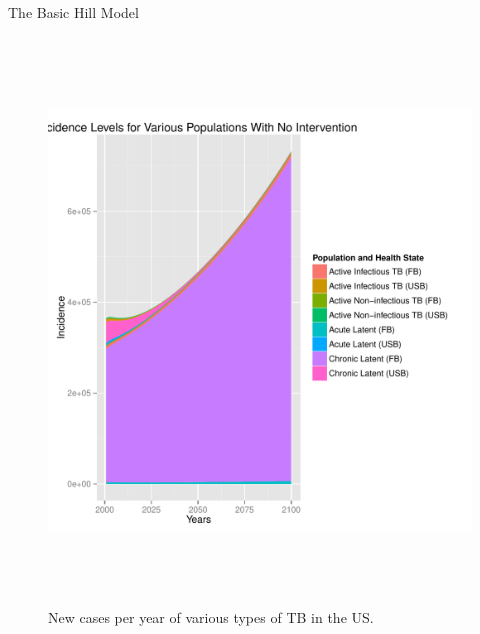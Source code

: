 \documentclass[final]{beamer}
\begin{document}
\begin{frame}
\begin{columns}
\begin{column}{.3\textwidth}
\begin{block}{The Basic Hill Model}
\begin{block}{}
\begin{figure}[h]
            \begin{center}
              \includegraphics[height=15cm,width=\textwidth]{incPlotTotal}
            \end{center}
            \caption{New cases per year of various types of TB in the US.}
            \label{fig:incPlotTotal}
          \end{figure}
        \end{block}
      \end{block}
    \end{column}
    

\end{columns}
\end{frame}
\end{document}
